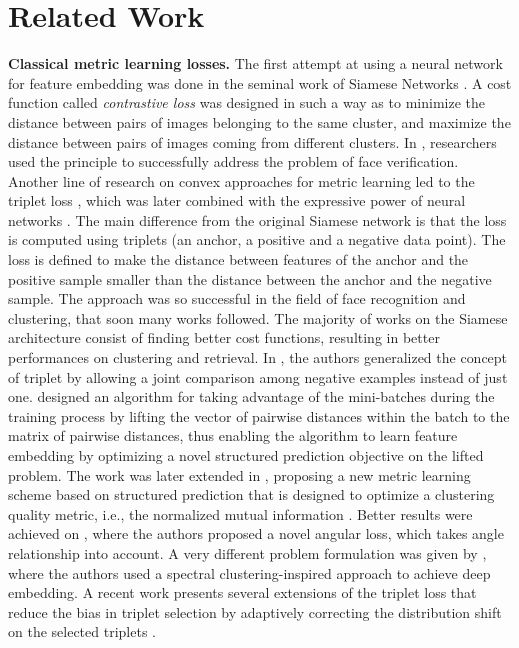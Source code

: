 \documentclass[runningheads]{llncs}
\begin{document}
\section{Related Work}

\noindent\textbf{Classical metric learning losses.} The first attempt at using a neural network for feature embedding was done in the seminal work of Siamese Networks \cite{bromley1994signature}. A cost function called \textit{contrastive loss} was designed in such a way as to minimize the distance between pairs of images belonging to the same cluster, and maximize the distance between pairs of images coming from different clusters. In \cite{DBLP:conf/cvpr/ChopraHL05}, researchers used the principle to successfully address the problem of face verification. Another line of research on convex approaches for metric learning led to the triplet loss \cite{DBLP:conf/nips/SchultzJ03,DBLP:journals/jmlr/WeinbergerS09}, which was later combined with the expressive power of neural networks \cite{DBLP:conf/cvpr/SchroffKP15}. The main difference from the original Siamese network is that the loss is computed using triplets (an anchor, a positive and a negative data point). 
The loss is defined to make the distance between features of the anchor and the positive sample smaller than the distance between the anchor and the negative sample. The approach was so successful in the field of face recognition and clustering, that soon many works followed. The majority of works on the Siamese architecture consist of finding better cost functions, resulting in better performances on clustering and retrieval. In \cite{DBLP:conf/nips/Sohn16}, the authors generalized the concept of triplet by allowing a joint comparison among  negative examples instead of just one. 
\cite{DBLP:conf/cvpr/SongXJS16} designed an algorithm for taking advantage of the mini-batches during the training process by lifting the vector of pairwise distances within the batch to the matrix of pairwise distances, thus enabling the algorithm to learn feature embedding by optimizing a novel structured prediction objective on the lifted problem. The work was later extended in \cite{DBLP:conf/cvpr/SongJR017}, proposing a new metric learning scheme based on structured prediction that is designed to optimize a clustering quality metric, i.e., the normalized mutual information \cite{DBLP:journals/corr/abs-1110-2515}. Better results were achieved on \cite{DBLP:conf/iccv/WangZWLL17}, where the authors proposed a novel angular loss, which takes angle relationship into account. A very different problem formulation was given by \cite{DBLP:conf/icml/LawUZ17}, where the authors used a spectral clustering-inspired approach to achieve deep embedding. A recent work presents several extensions of the triplet loss that reduce the bias in triplet selection by adaptively correcting the distribution shift on the selected triplets \cite{DBLP:conf/eccv/YuLGDT18}. 
\end{document}
